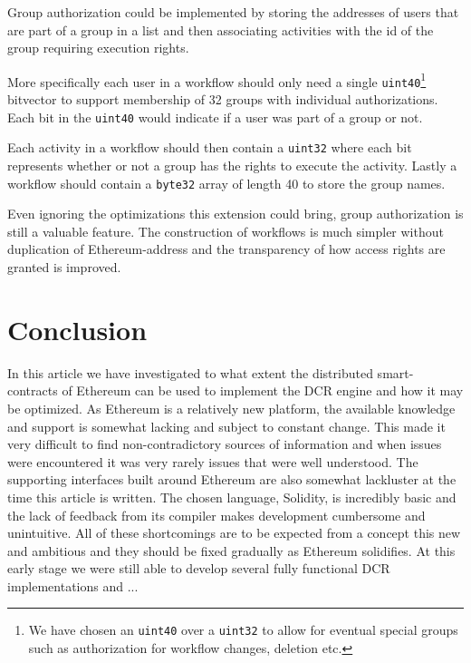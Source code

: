 \documentclass{article}
\begin{document}
		Group authorization could be implemented by storing the addresses of users that are part of a group in a list and then associating activities with the id of the group requiring execution rights.

		More specifically each user in a workflow should only need a single \texttt{uint40}\footnote{We have chosen an \texttt{uint40} over a \texttt{uint32} to allow for eventual special groups such as authorization for workflow changes, deletion etc.} bitvector to support membership of 32 groups with individual authorizations. Each bit in the \texttt{uint40} would indicate if a user was part of a group or not.

		Each activity in a workflow should then contain a \texttt{uint32} where each bit represents whether or not a group has the rights to execute the activity.
		Lastly a workflow should contain a \texttt{byte32} array of length 40 to store the group names.

		Even ignoring the optimizations this extension could bring, group authorization is still a valuable feature.
		The construction of workflows is much simpler without duplication of Ethereum-address and the transparency of how access rights are granted is improved.
		
	\section{Conclusion}

	In this article we have investigated to what extent the distributed smart-contracts of Ethereum can be used to implement the DCR engine and how it may be optimized.
	As Ethereum is a relatively new platform, the available knowledge and support is somewhat lacking and subject to constant change.
	This made it very difficult to find non-contradictory sources of information and when issues were encountered it was very rarely issues that were well understood.
	The supporting interfaces built around Ethereum are also somewhat lackluster at the time this article is written.
	The chosen language, Solidity, is incredibly basic and the lack of feedback from its compiler makes development cumbersome and unintuitive.
	All of these shortcomings are to be expected from a concept this new and ambitious and they should be fixed gradually as Ethereum solidifies.
	At this early stage we were still able to develop several fully functional DCR implementations and ...
\end{document}
